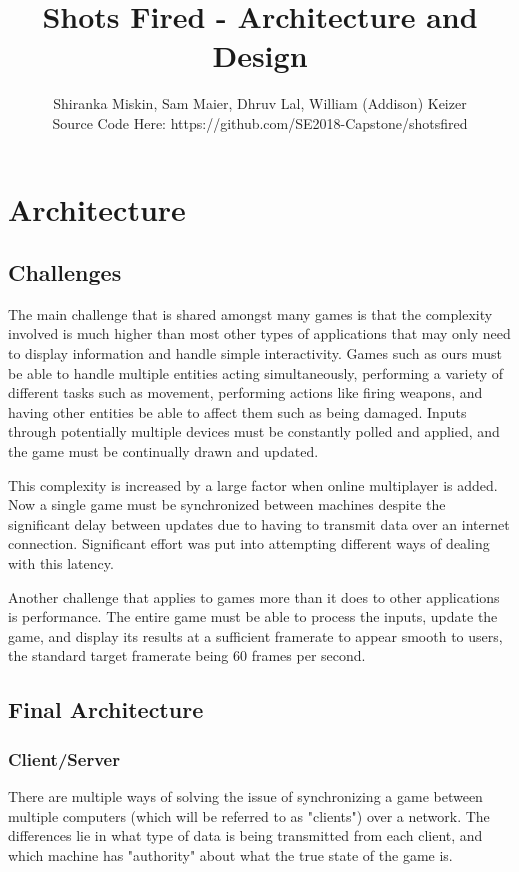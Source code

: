\documentclass[12pt]{report}
\author{Shiranka Miskin, Sam Maier, Dhruv Lal, William (Addison) Keizer \\ Source Code Here: https://github.com/SE2018-Capstone/shotsfired}
\title{Shots Fired - Architecture and Design}
\begin{document}
\maketitle

\tableofcontents
\chapter{Architecture}
\section{Challenges}

The main challenge that is shared amongst many games is that the complexity
involved is much higher than most other types of applications that may only need
to display information and handle simple interactivity.  Games such as ours must
be able to handle multiple entities acting simultaneously, performing a variety
of different tasks such as movement, performing actions like firing weapons, and
having other entities be able to affect them such as being damaged.  Inputs
through potentially multiple devices must be constantly polled and applied, and
the game must be continually drawn and updated.

This complexity is increased by a large factor when online
multiplayer is added. Now a single game must be synchronized between machines
despite the significant delay between updates due to having to transmit data
over an internet connection.  Significant effort was put into attempting
different ways of dealing with this latency.

Another challenge that applies to games more than it does to other applications
is performance.  The entire game must be able to process the inputs, update the
game, and display its results at a sufficient framerate to appear smooth to
users, the standard target framerate being 60 frames per second.

\section{Final Architecture}
\subsection{Client/Server}
There are multiple ways of solving the issue of synchronizing a game between
multiple computers (which will be referred to as "clients") over a network.  The
differences lie in what type of data is being transmitted from each client, and
which machine has "authority" about what the true state of the game is.
\end{document}
